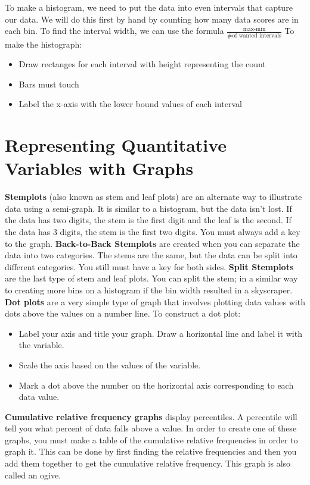 \documentclass[../stats.tex]{subfiles}
\begin{document}
To make a histogram, we need to put the data into even intervals that capture our data. We will do this first by hand by counting how many data scores are in each bin.
\smallbreak
To find the interval width, we can use the formula $\frac{\text{max-min}}{\text{\# of wanted intervals}}$
\smallbreak
To make the histograph:
\begin{itemize}
    \item Draw rectanges for each interval with height representing the count
    \item Bars must touch
    \item Label the x-axis with the lower bound values of each interval
\end{itemize}
\section{Representing Quantitative Variables with Graphs}
\textbf{Stemplots} (also known as stem and leaf plots) are an alternate way to illustrate data using a semi-graph. It is similar to a histogram, but the data isn't lost. If the data has two digits, the stem is the first digit and the leaf is the second. If the data has 3 digits, the stem is the first two digits. You must always add a key to the graph.
\smallbreak
\textbf{Back-to-Back Stemplots} are created when you can separate the data into two categories. The stems are the same, but the data can be split into different categories. You still must have a key for both sides.
\smallbreak
\textbf{Split Stemplots} are the last type of stem and leaf plots. You can split the stem; in a similar way to creating more bins on a histogram if the bin width resulted in a skyscraper.
\smallbreak
\textbf{Dot plots} are a very simple type of graph that involves plotting data values with dots above the values on a number line.
\smallbreak
To construct a dot plot:
\begin{itemize}
    \item Label your axis and title your graph. Draw a horizontal line and label it with the variable.
    \item Scale the axis based on the values of the variable.
    \item Mark a dot above the number on the horizontal axis corresponding to each data value.
\end{itemize}
\textbf{Cumulative relative frequency graphs} display percentiles. A percentile will tell you what percent of data falls above a value.
\smallbreak
In order to create one of these graphs, you must make a table of the cumulative relative frequencies in order to graph it. This can be done by first finding the relative frequencies and then you add them together to get the cumulative relative frequency. This graph is also called an ogive.
\end{document}
